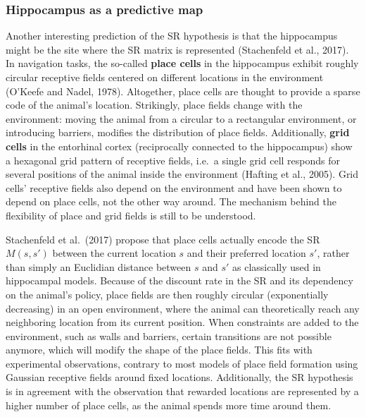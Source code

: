 \documentclass[
  11pt,
]{article}
\begin{document}
\hypertarget{hippocampus-as-a-predictive-map}{%
\subsubsection{Hippocampus as a predictive
map}\label{hippocampus-as-a-predictive-map}}

Another interesting prediction of the SR hypothesis is that the
hippocampus might be the site where the SR matrix is represented
(Stachenfeld et al., 2017). In navigation tasks, the so-called
\textbf{place cells} in the hippocampus exhibit roughly circular
receptive fields centered on different locations in the environment
(O'Keefe and Nadel, 1978). Altogether, place cells are thought to
provide a sparse code of the animal's location. Strikingly, place fields
change with the environment: moving the animal from a circular to a
rectangular environment, or introducing barriers, modifies the
distribution of place fields. Additionally, \textbf{grid cells} in the
entorhinal cortex (reciprocally connected to the hippocampus) show a
hexagonal grid pattern of receptive fields, i.e.~a single grid cell
responds for several positions of the animal inside the environment
(Hafting et al., 2005). Grid cells' receptive fields also depend on the
environment and have been shown to depend on place cells, not the other
way around. The mechanism behind the flexibility of place and grid
fields is still to be understood.

Stachenfeld et al.~(2017) propose that place cells actually encode the
SR \(M(s, s')\) between the current location \(s\) and their preferred
location \(s'\), rather than simply an Euclidian distance between \(s\)
and \(s'\) as classically used in hippocampal models. Because of the
discount rate in the SR and its dependency on the animal's policy, place
fields are then roughly circular (exponentially decreasing) in an open
environment, where the animal can theoretically reach any neighboring
location from its current position. When constraints are added to the
environment, such as walls and barriers, certain transitions are not
possible anymore, which will modify the shape of the place fields. This
fits with experimental observations, contrary to most models of place
field formation using Gaussian receptive fields around fixed locations.
Additionally, the SR hypothesis is in agreement with the observation
that rewarded locations are represented by a higher number of place
cells, as the animal spends more time around them.
\end{document}
